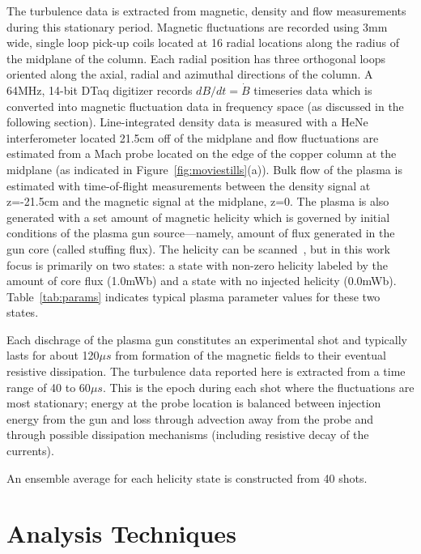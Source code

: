 \documentclass[aip,prl,amsmath,amssymb,reprint,superscriptaddress]{revtex4-1} %
\begin{document}
The turbulence data is extracted from magnetic, density and flow measurements during this stationary period. Magnetic fluctuations are recorded using 3mm wide, single loop pick-up coils located at 16 radial locations along the radius of the midplane of the column. Each radial position has three orthogonal loops oriented along the axial, radial and azimuthal directions of the column. A 64MHz, 14-bit DTaq digitizer records $dB/dt = \dot{B}$ timeseries data which is converted into magnetic fluctuation data in frequency space (as discussed in the following section). Line-integrated density data is measured with a HeNe interferometer located 21.5cm off of the midplane and flow fluctuations are estimated from a Mach probe located on the edge of the copper column at the midplane (as indicated in Figure~\ref{fig:moviestills}(a)). Bulk flow of the plasma is estimated with time-of-flight measurements between the density signal at z=-21.5cm and the magnetic signal at the midplane, z=0. The plasma is also generated with a set amount of magnetic helicity which is governed by initial conditions of the plasma gun source---namely, amount of flux generated in the gun core (called stuffing flux). The helicity can be scanned~\cite{schaffner14b}, but in this work focus is primarily on two states: a state with non-zero helicity labeled by the amount of core flux (1.0mWb) and a state with no injected helicity (0.0mWb). Table~\ref{tab:params} indicates typical plasma parameter values for these two states.

Each dischrage of the plasma gun constitutes an experimental shot and typically lasts for about 120$\mu s$ from formation of the magnetic fields to their eventual resistive dissipation. The turbulence data reported here is extracted from a time range of 40 to 60$\mu s$. This is the epoch during each shot where the fluctuations are most stationary; energy at the probe location is balanced between injection energy from the gun and loss through advection away from the probe and through possible dissipation mechanisms (including resistive decay of the currents).

An ensemble average for each helicity state is constructed from 40 shots.

\section{Analysis Techniques}\label{sec:analysis}
\end{document}
